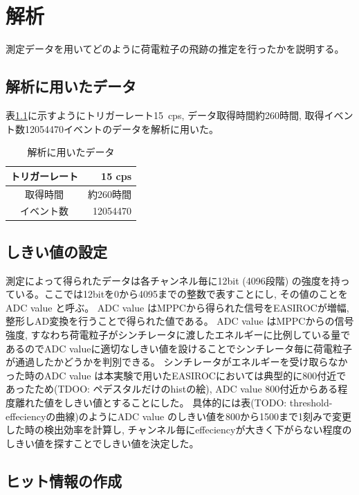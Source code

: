 \chapter{解析}\label{analysis}
測定データを用いてどのように荷電粒子の飛跡の推定を行ったかを説明する。

\section{解析に用いたデータ}\label{sec:anal:data}
表\ref{tab:analyzed_data}に示すようにトリガーレート15\ cps, データ取得時間約260時間, 取得イベント数12054470イベントのデータを解析に用いた。
\begin{table}[H]
    \centering
    \caption{解析に用いたデータ}
    \label{tab:analyzed_data}
    \begin{tabular}{|c|r|}
        \hline
        トリガーレート & 15 cps    \\ \hline
        取得時間       & 約260時間 \\ \hline
        イベント数     & 12054470  \\ \hline
    \end{tabular}
\end{table}

\section{しきい値の設定}\label{sec:anal:threshold}
測定によって得られたデータは各チャンネル毎に12bit (4096段階) の強度を持っている。ここでは12bitを0から4095までの整数で表すことにし, その値のことを ADC value と呼ぶ。
ADC value はMPPCから得られた信号をEASIROCが増幅, 整形しAD変換を行うことで得られた値である。
ADC value はMPPCからの信号強度, すなわち荷電粒子がシンチレータに渡したエネルギーに比例している量であるのでADC valueに適切なしきい値を設けることでシンチレータ毎に荷電粒子が通過したかどうかを判別できる。
シンチレータがエネルギーを受け取らなかった時のADC value は本実験で用いたEASIROCにおいては典型的に800付近であったため(TDOO: ペデスタルだけのhistの絵), ADC value 800付近からある程度離れた値をしきい値とすることにした。
具体的には表(TODO: threshold-effeciencyの曲線)のようにADC value のしきい値を800から1500まで1刻みで変更した時の検出効率を計算し, チャンネル毎にeffeciencyが大きく下がらない程度のしきい値を探すことでしきい値を決定した。

\section{ヒット情報の作成}
